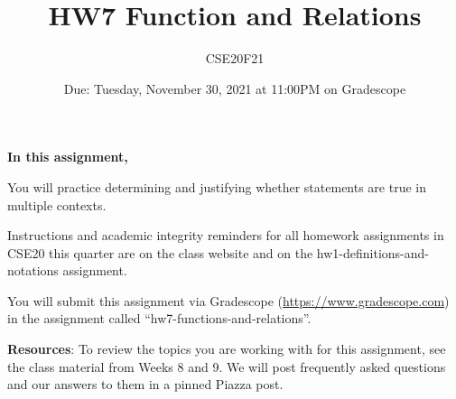 \documentclass[12pt, oneside]{article}
\author{CSE20F21}
\title{HW7 Function and Relations}
\date{Due: Tuesday, November 30, 2021 at 11:00PM on Gradescope}
\begin{document}
\maketitle
\thispagestyle{fancy}

{\bf In this assignment,}

You will practice determining and justifying whether 
statements are true in multiple contexts.

Instructions and academic integrity reminders for all homework assignments in 
CSE20 this quarter are on the class website and on the hw1-definitions-and-notations
assignment.

You will submit this assignment via Gradescope
(\href{https://www.gradescope.com}{https://www.gradescope.com}) 
in the assignment called ``hw7-functions-and-relations''.

{\bf Resources}: To review the topics you are working with 
for this assignment, see the class material from Weeks 8 and 9.
We will post frequently asked questions and our answers to them in a 
pinned Piazza post.
\end{document}
